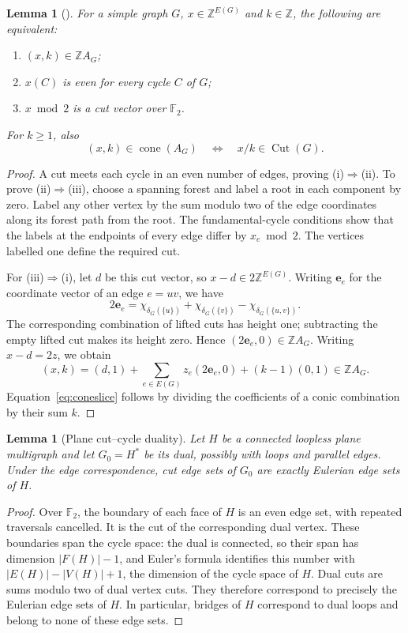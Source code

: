 \documentclass[10pt]{article}
\newtheorem{lemma}[theorem]{Lemma}
\theoremstyle{definition}
\theoremstyle{remark}
\DeclareMathOperator{\Cut}{Cut}
\DeclareMathOperator{\cone}{cone}
\newcommand{\ZZ}{\mathbb Z}
\begin{document}
\begin{lemma}[{\cite[equation~(1)]{Ohsugi}}]\label{lem:lattice}
For a simple graph $G$, $x\in\ZZ^{E(G)}$ and $k\in\ZZ$, the following are equivalent:
\begin{enumerate}[label=\textup{(\roman*)}]
\item $(x,k)\in\ZZ A_G$;
\item $x(C)$ is even for every cycle $C$ of $G$;
\item $x\bmod2$ is a cut vector over $\mathbb F_2$.
\end{enumerate}
For $k\geq1$, also
\begin{equation}\label{eq:coneslice}
 (x,k)\in\cone(A_G)\quad\Longleftrightarrow\quad x/k\in\Cut(G).
\end{equation}
\end{lemma}
\begin{proof}
A cut meets each cycle in an even number of edges, proving (i)$\Rightarrow$(ii).
To prove (ii)$\Rightarrow$(iii), choose a spanning forest and label a root in each component by zero.
Label any other vertex by the sum modulo two of the edge coordinates along its forest path from the root.
The fundamental-cycle conditions show that the labels at the endpoints of every edge differ by $x_e\bmod2$.
The vertices labelled one define the required cut.

For (iii)$\Rightarrow$(i), let $d$ be this cut vector, so $x-d\in2\ZZ^{E(G)}$.
Writing $\mathbf e_e$ for the coordinate vector of an edge $e=uv$, we have
\[
 2\mathbf e_e=\chi_{\delta_G(\{u\})}
 +\chi_{\delta_G(\{v\})}-\chi_{\delta_G(\{u,v\})}.
\]
The corresponding combination of lifted cuts has height one; subtracting the empty lifted cut makes its height zero.
Hence $(2\mathbf e_e,0)\in\ZZ A_G$.
Writing $x-d=2z$, we obtain
\[
 (x,k)=(d,1)+\sum_{e\in E(G)}z_e(2\mathbf e_e,0)+(k-1)(0,1)\in\ZZ A_G.
\]
Equation~\eqref{eq:coneslice} follows by dividing the coefficients of a conic combination by their sum $k$.
\end{proof}

\begin{lemma}[Plane cut--cycle duality]\label{lem:duality}
Let $H$ be a connected loopless plane multigraph and let $G_0=H^*$ be its dual, possibly with loops and parallel edges.
Under the edge correspondence, cut edge sets of $G_0$ are exactly Eulerian edge sets of $H$.
\end{lemma}
\begin{proof}
Over $\mathbb F_2$, the boundary of each face of $H$ is an even edge set, with repeated traversals cancelled.
It is the cut of the corresponding dual vertex.
These boundaries span the cycle space: the dual is connected, so their span has dimension $|F(H)|-1$, and Euler's formula identifies this number with $|E(H)|-|V(H)|+1$, the dimension of the cycle space of $H$.
Dual cuts are sums modulo two of dual vertex cuts.
They therefore correspond to precisely the Eulerian edge sets of $H$.
In particular, bridges of $H$ correspond to dual loops and belong to none of these edge sets.
\end{proof}
\end{document}

